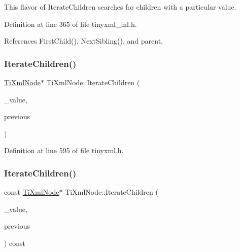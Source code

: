 This flavor of Iterate\+Children searches for children with a particular \textquotesingle{}value\textquotesingle{}. 



Definition at line 365 of file tinyxml\+\_\+inl.\+h.



References First\+Child(), Next\+Sibling(), and parent.

\hypertarget{class_ti_xml_node_a67ba8275e533e6f76340236c42ea0aea}{}\label{class_ti_xml_node_a67ba8275e533e6f76340236c42ea0aea} 
\subsubsection{\texorpdfstring{Iterate\+Children()}{IterateChildren()}\hspace{0.1cm}{\footnotesize\ttfamily [4/6]}}
{\footnotesize\ttfamily \hyperlink{class_ti_xml_node}{Ti\+Xml\+Node}$\ast$ Ti\+Xml\+Node\+::\+Iterate\+Children (\begin{DoxyParamCaption}\item[{const char $\ast$}]{\+\_\+value,  }\item[{const \hyperlink{class_ti_xml_node}{Ti\+Xml\+Node} $\ast$}]{previous }\end{DoxyParamCaption})\hspace{0.3cm}{\ttfamily [inline]}}



Definition at line 595 of file tinyxml.\+h.

\hypertarget{class_ti_xml_node_a412c25b2b7e6709a4b291b13df0632eb}{}\label{class_ti_xml_node_a412c25b2b7e6709a4b291b13df0632eb} 
\subsubsection{\texorpdfstring{Iterate\+Children()}{IterateChildren()}\hspace{0.1cm}{\footnotesize\ttfamily [5/6]}}
{\footnotesize\ttfamily const \hyperlink{class_ti_xml_node}{Ti\+Xml\+Node}$\ast$ Ti\+Xml\+Node\+::\+Iterate\+Children (\begin{DoxyParamCaption}\item[{const std\+::string \&}]{\+\_\+value,  }\item[{const \hyperlink{class_ti_xml_node}{Ti\+Xml\+Node} $\ast$}]{previous }\end{DoxyParamCaption}) const\hspace{0.3cm}{\ttfamily [inline]}}



